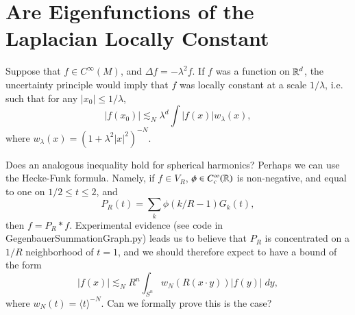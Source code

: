 %
%
%
%
% 
% 
%
%
%
%
%





\chapter{Are Eigenfunctions of the Laplacian Locally Constant}

Suppose that $f \in C^\infty(M)$, and $\Delta f = - \lambda^2 f$. If $f$ was a function on $\operatorname{\mathbb{R}}^d$, the uncertainty principle would imply that $f$ was locally constant at a scale $1/\lambda$, i.e. such that for any $|x_0| \leq 1/\lambda$,
%
\[ |f(x_0)| \lesssim_N \lambda^d \int |f(x)| w_\lambda(x), \]
%
where $w_\lambda(x) = (1 + \lambda^2 |x|^2 )^{-N}$.

Does an analogous inequality hold for spherical harmonics? Perhaps we can use the Hecke-Funk formula. Namely, if $f \in V_R$, $\phi \in C_c^\infty(\operatorname{\mathbb{R}})$ is non-negative, and equal to one on $1/2 \leq t \leq 2$, and
%
\[ P_R(t) = \sum_k \phi( k/R - 1 ) G_k(t), \]
%
then $f = P_R * f$. Experimental evidence (see code in GegenbauerSummationGraph.py) leads us to believe that $P_R$ is concentrated on a $1/R$ neighborhood of $t = 1$, and we should therefore expect to have a bound of the form
%
\[ |f(x)| \lesssim_N R^n \int_{S^n} w_N(R(x \cdot y)) |f(y)|\; dy, \]
%
where $w_N(t) = \langle t \rangle^{-N}$. Can we formally prove this is the case?








